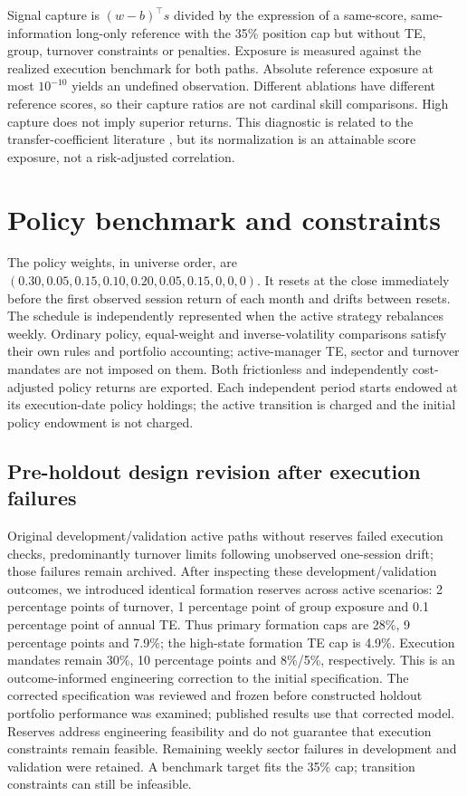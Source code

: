 \documentclass[11pt,a4paper]{article}
\begin{document}
Signal capture is $(w-b)^\top s$ divided by the expression of a same-score,
same-information long-only reference with the 35\% position cap but without
TE, group, turnover constraints or penalties. Exposure is measured against
the realized execution benchmark for both paths. Absolute reference exposure
at most $10^{-10}$ yields an undefined observation. Different ablations have
different reference scores, so their capture ratios are not cardinal skill
comparisons. High capture does not imply superior returns.
This diagnostic is related to the transfer-coefficient literature \cite{cdt},
but its normalization is an attainable score exposure, not a risk-adjusted
correlation.
\section{Policy benchmark and constraints}
The policy weights, in universe order, are
$(0.30,0.05,0.15,0.10,0.20,0.05,0.15,0,0,0)$.
It resets at the close immediately before the first observed session return
of each month and drifts between resets. The schedule is independently
represented when the active strategy rebalances weekly. Ordinary policy,
equal-weight and inverse-volatility comparisons satisfy their own rules and
portfolio accounting; active-manager TE, sector and turnover mandates are
not imposed on them. Both frictionless and independently cost-adjusted
policy returns are exported. Each independent period starts endowed at
its execution-date policy holdings; the active transition is charged and
the initial policy endowment is not charged.

\subsection{Pre-holdout design revision after execution failures}
Original development/validation active paths without reserves failed execution
checks, predominantly turnover limits following unobserved one-session drift;
those failures remain archived. After inspecting these development/validation
outcomes, we introduced identical formation reserves across
active scenarios: 2 percentage points of turnover, 1 percentage point of group
exposure and 0.1 percentage point of annual TE. Thus primary formation caps are
28\%, 9 percentage points and 7.9\%; the high-state formation TE cap is 4.9\%.
Execution mandates remain 30\%, 10 percentage points and 8\%/5\%, respectively.
This is an outcome-informed engineering correction to the initial specification.
The corrected specification was reviewed and frozen before constructed holdout
portfolio performance was examined; published results use that corrected model.
Reserves address engineering feasibility and do not guarantee that execution
constraints remain feasible. Remaining weekly sector failures in development
and validation were retained. A benchmark target
fits the 35\% cap; transition constraints can still be infeasible.
\end{document}
